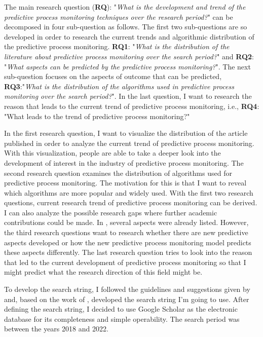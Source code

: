 \documentclass[runningheads]{llncs}
\begin{document}
		The main research question (\textbf{RQ}): "\textit{What is the development and trend of the predictive process monitoring techniques over the research period?}" can be decomposed in four sub-question as follows. The first two sub-questions are so developed in order to research the current trends and algorithmic distribution of the predictive process monitoring. \textbf{RQ1}: "\textit{What is the distribution of the literature about predictive process monitoring over the search period?}" and \textbf{RQ2}: "\textit{What aspects can be predicted by the predictive process monitoring?}". The next sub-question focuses on the aspects of outcome that can be predicted, \textbf{RQ3}:"\textit{What is the distribution of the algorithms used in predictive process monitoring over the search period?}". In the last question, I want to research the reason that leads to the current trend of predictive process monitoring, i.e., \textbf{RQ4}: "What leads to the trend of predictive process monitoring?"
		
		In the first research question, I want to visualize the distribution of the article published in order to analyze the current trend of predictive process monitoring. With this visualization, people are able to take a deeper look into the development of interest in the industry of predictive process monitoring. The second research question examines the distribution of algorithms used for predictive process monitoring. The motivation for this is that I want to reveal which algorithms are more popular and widely used. With the first two research questions, current research trend of predictive process monitoring can be derived. I can also analyze the possible research gaps where further academic contributions could be made. In \cite{original}, several aspects were already listed. However, the third research questions want to research whether there are new predictive aspects developed or how the new predictive process monitoring model predicts these aspects differently. The last research question tries to look into the reason that led to the current development of predictive process monitoring so that I might predict what the research direction of this field might be.
		
		To develop the search string, I followed the guidelines and suggestions given by \cite{guideline} and, based on the work of \cite{original}, developed the search string I'm going to use. After defining the search string, I decided to use Google Scholar as the electronic database for its completeness and simple operability. The search period was between the years 2018 and 2022.
		
\end{document}
